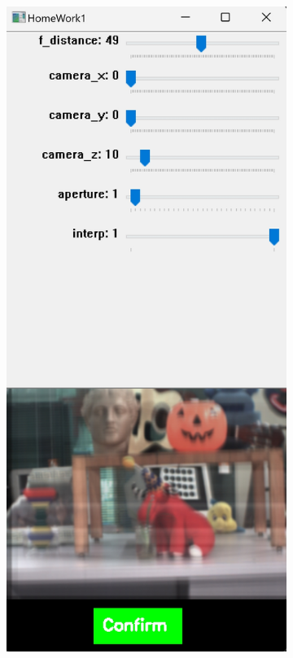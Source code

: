\documentclass{article}
\begin{document}
\begin{figure}[h]
    \centering
    \begin{subfigure}{0.35\textwidth}
        \centering
        \includegraphics[width=\textwidth]{interp_2.png} %

\end{subfigure}
\end{figure}
\end{document}

